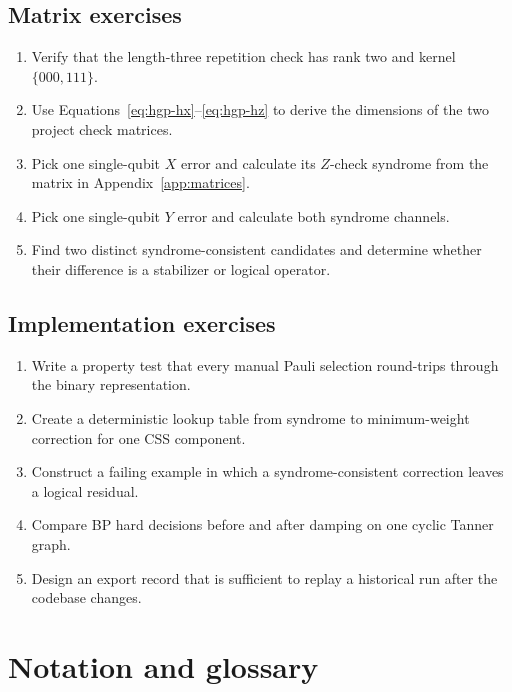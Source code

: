 \documentclass[11pt,letterpaper]{article}
\begin{document}
\subsection{Matrix exercises}

\begin{enumerate}
  \item Verify that the length-three repetition check has rank two and kernel
  $\{000,111\}$.
  \item Use Equations~\eqref{eq:hgp-hx}--\eqref{eq:hgp-hz} to derive the dimensions of the two
  project check matrices.
  \item Pick one single-qubit $X$ error and calculate its $Z$-check syndrome from the matrix in
  Appendix~\ref{app:matrices}.
  \item Pick one single-qubit $Y$ error and calculate both syndrome channels.
  \item Find two distinct syndrome-consistent candidates and determine whether their difference is
  a stabilizer or logical operator.
\end{enumerate}

\subsection{Implementation exercises}

\begin{enumerate}
  \item Write a property test that every manual Pauli selection round-trips through the binary
  representation.
  \item Create a deterministic lookup table from syndrome to minimum-weight correction for one CSS
  component.
  \item Construct a failing example in which a syndrome-consistent correction leaves a logical
  residual.
  \item Compare BP hard decisions before and after damping on one cyclic Tanner graph.
  \item Design an export record that is sufficient to replay a historical run after the codebase
  changes.
\end{enumerate}

\clearpage
\appendix

\section{Notation and glossary}
\end{document}
